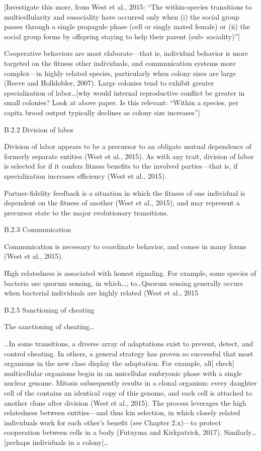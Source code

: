 \documentclass{tufte-book} %
\begin{document}
[Investigate this more, from West et al., 2015: “The within-species transitions to multicellularity and eusociality have occurred only when (i) the social group passes through a single propagule phase (cell or singly mated female) or (ii) the social group forms by offspring staying to help their parent (sub- sociality)”]

Cooperative behaviors are most elaborate—that is, individual behavior is more targeted on the fitness other individuals, and communication systems more complex—in highly related species, particularly when colony sizes are large (Reeve and Holldobler, 2007). Large colonies tend to exhibit greater specialization of labor…[why would internal reproductive conflict be greater in small colonies? Look at above paper. Is this relevant: “Within a species, per capita brood output typically declines as colony size increases”]

B.2.2 Division of labor

Division of labor appears to be a precursor to an obligate mutual dependence of formerly separate entities (West et al., 2015). As with any trait, division of labor is selected for if it confers fitness benefits to the involved parties—that is, if specialization increases efficiency (West et al., 2015). 

Partner-fidelity feedback is a situation in which the fitness of one individual is dependent on the fitness of another (West et al., 2015), and may  represent a precursor state to the major evolutionary transitions.

B.2.3 Communication

Communication is necessary to coordinate behavior, and comes in many forms (West et al., 2015).

High relatedness is associated with honest signaling. For example, some species of bacteria use quorum sensing, in which…, to…Quorum sensing generally occurs when bacterial individuals are highly related (West et al., 2015

B.2.5 Sanctioning of cheating 

The sanctioning of cheating…

…In some transitions, a diverse array of adaptations exist to prevent, detect, and control cheating. In others, a general strategy has proven so successful that most organisms in the new class display the adaptation. For example, all[ check] multicellular organisms begin in an unicellular embryonic phase with a single nuclear genome. Mitosis subsequently  results in a clonal organism: every daughter cell of the  contains an identical copy of this genome, and each cell is attached to another clone after division (West et al., 2015). The process leverages the high relatedness between entities—and thus kin selection, in which closely related individuals work for each other’s benefit (see Chapter 2.x)—to protect cooperation between cells in a body (Futuyma and Kirkpatrick, 2017). 
Similarly…[perhaps individuals in a colony]…
\end{document}
